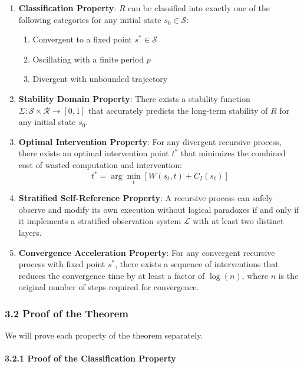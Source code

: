 \documentclass[
]{article}
\providecommand{\tightlist}{%
  \setlength{\itemsep}{0pt}\setlength{\parskip}{0pt}}
\begin{document}
\begin{enumerate}
\def\labelenumi{\arabic{enumi}.}
\item
  \textbf{Classification Property}: \(R\) can be classified into exactly
  one of the following categories for any initial state
  \(s_0 \in \mathcal{S}\):

  \begin{enumerate}
  \def\labelenumii{\alph{enumii}.}
  \tightlist
  \item
    Convergent to a fixed point \(s^* \in \mathcal{S}\)
  \item
    Oscillating with a finite period \(p\)
  \item
    Divergent with unbounded trajectory
  \end{enumerate}
\item
  \textbf{Stability Domain Property}: There exists a stability function
  \(\Sigma: \mathcal{S} \times \mathcal{R} \rightarrow [0,1]\) that
  accurately predicts the long-term stability of \(R\) for any initial
  state \(s_0\).
\item
  \textbf{Optimal Intervention Property}: For any divergent recursive
  process, there exists an optimal intervention point \(t^*\) that
  minimizes the combined cost of wasted computation and intervention:
  \[t^* = \arg\min_{t} [W(s_t, t) + C_I(s_t)]\]
\item
  \textbf{Stratified Self-Reference Property}: A recursive process can
  safely observe and modify its own execution without logical paradoxes
  if and only if it implements a stratified observation system
  \(\mathcal{L}\) with at least two distinct layers.
\item
  \textbf{Convergence Acceleration Property}: For any convergent
  recursive process with fixed point \(s^*\), there exists a sequence of
  interventions that reduces the convergence time by at least a factor
  of \(\log(n)\), where \(n\) is the original number of steps required
  for convergence.
\end{enumerate}

\subsubsection{3.2 Proof of the Theorem}\label{proof-of-the-theorem}

We will prove each property of the theorem separately.

\paragraph{3.2.1 Proof of the Classification
Property}\label{proof-of-the-classification-property}
\end{document}
